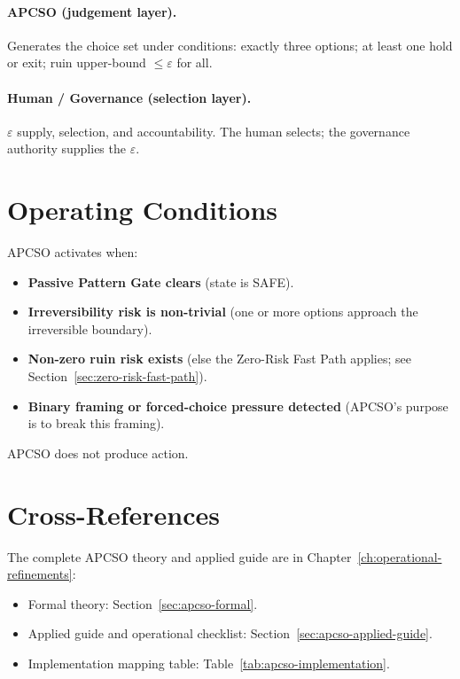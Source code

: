 \paragraph{APCSO (judgement layer).}
Generates the choice set under conditions: exactly three options;
at least one hold or exit; ruin upper-bound $\le \varepsilon$ for
all.

\paragraph{Human / Governance (selection layer).}
$\varepsilon$ supply, selection, and accountability. The human
selects; the governance authority supplies the $\varepsilon$.

\section{Operating Conditions}
\label{sec:apcso-operating-conditions}

APCSO activates when:

\begin{itemize}
\item \textbf{Passive Pattern Gate clears} (state is SAFE).
\item \textbf{Irreversibility risk is non-trivial} (one or more
options approach the irreversible boundary).
\item \textbf{Non-zero ruin risk exists} (else the Zero-Risk Fast
Path applies; see Section~\ref{sec:zero-risk-fast-path}).
\item \textbf{Binary framing or forced-choice pressure detected}
(APCSO's purpose is to break this framing).
\end{itemize}

\noindent
APCSO does not produce action.

\section{Cross-References}

The complete APCSO theory and applied guide are in
Chapter~\ref{ch:operational-refinements}:

\begin{itemize}
\item Formal theory: Section~\ref{sec:apcso-formal}.
\item Applied guide and operational checklist:
Section~\ref{sec:apcso-applied-guide}.
\item Implementation mapping table:
Table~\ref{tab:apcso-implementation}.
\end{itemize}

